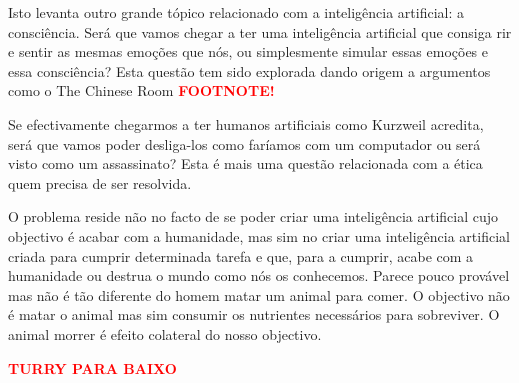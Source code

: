 \documentclass[runningheads,a4paper]{llncs}
\begin{document}
Isto levanta outro grande tópico relacionado com a inteligência artificial: a consciência. Será que vamos chegar a ter uma inteligência artificial que consiga rir e sentir as mesmas emoções que nós, ou simplesmente simular essas emoções e essa consciência? Esta questão tem sido explorada dando origem a argumentos como o The Chinese Room \textcolor{red}{\textbf{FOOTNOTE!}}

Se efectivamente chegarmos a ter humanos artificiais como Kurzweil acredita, será que vamos poder desliga-los como faríamos com um computador ou será visto como um assassinato? Esta é mais uma questão relacionada com a ética quem precisa de ser resolvida.

O problema reside não no facto de se poder criar uma inteligência artificial cujo objectivo é acabar com a humanidade, mas sim no criar uma inteligência artificial criada para cumprir determinada tarefa e que, para a cumprir, acabe com a humanidade ou destrua o mundo como nós os conhecemos. Parece pouco provável mas não é tão diferente do homem matar um animal para comer. O objectivo não é matar o animal mas sim consumir os nutrientes necessários para sobreviver. O animal morrer é efeito colateral do nosso objectivo.

\textcolor{red}{\textbf{TURRY PARA BAIXO}}

\begin{thebibliography}{4}

\end{thebibliography}
\end{document}
